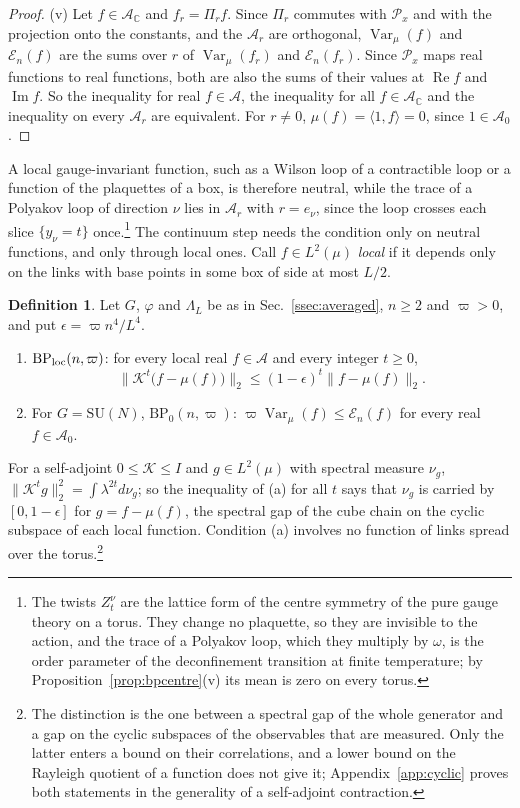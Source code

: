\documentclass[aps,prd,twocolumn,superscriptaddress,nofootinbib,longbibliography,floatfix,amsmath,amssymb,10pt]{revtex4-2}
\theoremstyle{definition}
\newtheorem{definition}[theorem]{Definition}
\theoremstyle{remark}
\newcommand{\C}{\mathbb{C}}
\newcommand{\SU}{\mathrm{SU}}
\newcommand{\Var}{\operatorname{Var}}
\newcommand{\ip}[2]{\langle #1,#2\rangle}
\begin{document}
\begin{proof}
(v) Let $f\in\mathcal A_\C$ and $f_r=\Pi_rf$. Since $\Pi_r$ commutes with
$\mathcal P_x$ and with the projection onto the constants, and the
$\mathcal A_r$ are orthogonal, $\Var_\mu(f)$ and $\mathcal E_n(f)$ are the
sums over $r$ of $\Var_\mu(f_r)$ and $\mathcal E_n(f_r)$. Since $\mathcal
P_x$ maps real functions to real functions, both are also the sums of their
values at $\operatorname{Re}f$ and $\operatorname{Im}f$. So the inequality
for real $f\in\mathcal A$, the inequality for all $f\in\mathcal A_\C$ and the
inequality on every $\mathcal A_r$ are equivalent. For $r\ne0$, $\mu(f)=\ip
1f=0$, since $1\in\mathcal A_0$.
\end{proof}

A local gauge-invariant function, such as a Wilson loop of a contractible
loop or a function of the plaquettes of a box, is therefore neutral, while
the trace of a Polyakov loop of direction $\nu$ lies in $\mathcal A_r$ with
$r=e_\nu$, since the loop crosses each slice $\{y_\nu=t\}$ once.\footnote{The
twists $Z^\nu_t$ are the lattice form of the centre symmetry of the pure
gauge theory on a torus. They change no plaquette, so they are invisible
to the action, and the trace of a Polyakov loop, which they multiply by
$\omega$, is the order parameter of the deconfinement transition at
finite temperature; by Proposition~\ref{prop:bpcentre}(v) its mean is zero
on every torus.} The
continuum step needs the condition only on neutral functions, and only
through local ones. Call $f\in L^2(\mu)$ \emph{local} if it depends only on
the links with base points in some box of side at most $L/2$.

\begin{definition}\label{def:bploc}
Let $G$, $\varphi$ and $\Lambda_L$ be as in Sec.~\ref{ssec:averaged}, $n\ge2$
and $\varpi>0$, and put $\epsilon=\varpi n^4/L^4$.
\begin{enumerate}[label=\textup{(\alph*)},leftmargin=*]
\item $\mathrm{BP}_{\rm loc}(n,\varpi)$: for every local real $f\in\mathcal
A$ and every integer $t\ge0$,
\[
\bigl\lVert\mathcal K^t\bigl(f-\mu(f)\bigr)\bigr\rVert_2\le(1-\epsilon)^t
\bigl\lVert f-\mu(f)\bigr\rVert_2 .
\]
\item For $G=\SU(N)$, $\mathrm{BP}_0(n,\varpi)$: $\varpi\Var_\mu(f)\le
\mathcal E_n(f)$ for every real $f\in\mathcal A_0$.
\end{enumerate}
\end{definition}

For a self-adjoint $0\le\mathcal K\le I$ and $g\in L^2(\mu)$ with spectral
measure $\nu_g$, $\lVert\mathcal K^tg\rVert_2^2=\int\lambda^{2t}d\nu_g$; so
the inequality of (a) for all $t$ says that $\nu_g$ is carried by $[0,1-
\epsilon]$ for $g=f-\mu(f)$, the spectral gap of the cube chain on the cyclic
subspace of each local function. Condition (a) involves no function of
links spread over the torus.\footnote{The distinction is the one between
a spectral gap of the whole generator and a gap on the cyclic subspaces of
the observables that are measured. Only the latter enters a bound on
their correlations, and a lower bound on the Rayleigh quotient of a
function does not give it; Appendix~\ref{app:cyclic} proves both
statements in the generality of a self-adjoint contraction.}
\end{document}
